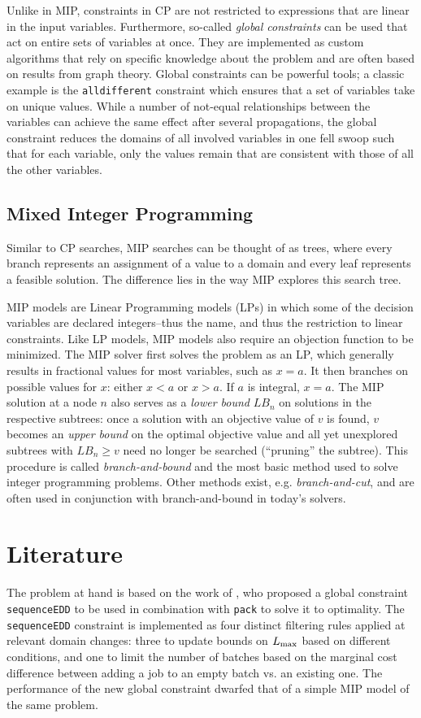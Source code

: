 \documentclass[13pt, letterpaper, oneside]{book}
\begin{document}
Unlike in MIP, constraints in CP are not restricted to expressions that are
linear in the input variables. Furthermore, so-called \textit{global
constraints} can be used that act on entire sets of variables at once. They are
implemented as custom algorithms that rely on specific knowledge about the
problem and are often based on results from graph theory. Global constraints can
be powerful tools; a classic example is the \texttt{alldifferent} constraint
which ensures that a set of variables take on unique values. While a number of
not-equal relationships between the variables can achieve the same effect after
several propagations, the global constraint reduces the domains of all involved
variables in one fell swoop such that for each variable, only the values remain
that are consistent with those of all the other variables.

\subsection{Mixed Integer Programming}
Similar to CP searches, MIP searches can be thought of as trees, where every
branch represents an assignment of a value to a domain and every leaf represents
a feasible solution. The difference lies in the way MIP explores this search tree.

MIP models are Linear Programming models (LPs) in which some of the decision
variables are declared integers--thus the name, and thus the restriction to
linear constraints. Like LP models, MIP models also require an objection
function to be minimized. The MIP solver first solves the problem as an LP,
which generally results in fractional values for most variables, such as $x =
a$. It then branches on possible values for $x$: either $x < a$ or $x > a$. If
$a$ is integral, $x = a$.  The MIP solution at a node $n$ also serves as a
\textit{lower bound} $LB_n$ on solutions in the respective subtrees: once a
solution with an objective value of $v$ is found, $v$ becomes an \textit{upper
bound} on the optimal objective value and all yet unexplored subtrees with $LB_n
\geq v$ need no longer be searched (``pruning'' the subtree). This procedure is
called \textit{branch-and-bound} and the most basic method used to solve integer
programming problems. Other methods exist, e.g. \textit{branch-and-cut}, and are
often used in conjunction with branch-and-bound in today's solvers.

\section{Literature}
The problem at hand is based on the work of \citet{Malapert}, who proposed a global
constraint \texttt{sequenceEDD} to be used in combination with \texttt{pack} to
solve it to optimality. The \texttt{sequenceEDD} constraint is implemented as
four distinct filtering rules applied at relevant domain changes: three to update
bounds on $L_{\text{max}}$ based on different conditions, and one to limit the number of
batches based on the marginal cost difference between adding a job to an empty batch vs. an
existing one. The performance of the new global constraint dwarfed that of a
simple MIP model of the same problem.
\end{document}
